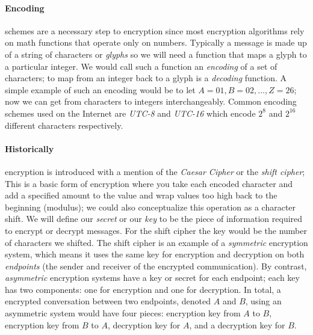 \documentclass[12pt]{article}
\begin{document}
\paragraph{Encoding} schemes are a necessary step to encryption since most encryption algorithms rely on math functions that operate only on numbers.  Typically a message is made up of a string of characters or \textit{glyphs} so we will need a function that maps a glyph to a particular integer.  We would call such a function an \textit{encoding} of a set of characters; to map from an integer back to a glyph is a \textit{decoding} function.  A simple example of such an encoding would be to let $A=01,B=02,...,Z=26$; now we can get from characters to integers interchangeably.  Common encoding schemes used on the Internet are \textit{UTC-8} and \textit{UTC-16} which encode $2^8$ and $2^{16}$ different characters respectively.

\paragraph{Historically} encryption is introduced with a mention of the \textit{Caesar Cipher} or the \textit{shift cipher}; This is a basic form of encryption where you take each encoded character and add a specified amount to the value and wrap values too high back to the beginning (modulus); we could also conceptualize this operation as a character shift.  We will define our \textit{secret} or our \textit{key} to be the piece of information required to encrypt or decrypt messages.  For the shift cipher the key would be the number of characters we shifted.  The shift cipher is an example of a \textit{symmetric} encryption system, which means it uses the same key for encryption and decryption on both \textit{endpoints} (the sender and receiver of the encrypted communication).  By contrast, \textit{asymmetric} encryption systems have a key or secret for each endpoint; each key has two components: one for encryption and one for decryption.  In total, a encrypted conversation between two endpoints, denoted $A$ and $B$, using an asymmetric system would have four pieces: encryption key from $A$ to $B$, encryption key from $B$ to $A$, decryption key for $A$, and a decryption key for $B$.
\end{document}
